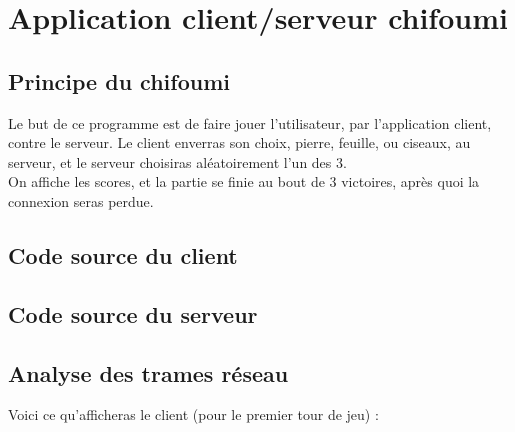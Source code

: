 \documentclass[10pt,a4paper,final]{article}
\begin{document}
\section{Application client/serveur chifoumi}
	\subsection{Principe du chifoumi}
		Le but de ce programme est de faire jouer l'utilisateur, par l'application client, contre le serveur. Le client enverras son choix, pierre, feuille, ou ciseaux,
		au serveur, et le serveur choisiras aléatoirement l'un des 3. \\
		On affiche les scores, et la partie se finie au bout de 3 victoires, après quoi la connexion seras perdue.

	\subsection{Code source du client}
		

	\subsection{Code source du serveur}
		

	\subsection{Analyse des trames réseau}
		Voici ce qu'afficheras le client (pour le premier tour de jeu) :\\
		
\end{document}
